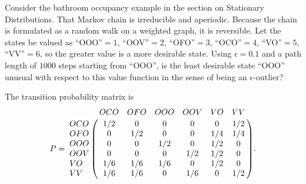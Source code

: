 \documentclass[12pt]{article}
\begin{document}
\begin{exercise}
    Consider the bathroom occupancy example in the section on Stationary
    Distributions.  That Markov chain is irreducible and aperiodic.
    Because the chain is formulated as a random walk on a weighted
    graph, it is reversible.  Let the states be valued as ``OOO''\( =1 \),
    ``OOV''\( =2 \), ``OFO''\( =3 \), ``OCO''\( =4 \), ``VO''\( =5 \),
    ``VV''\( =6 \), so the greater value is a more desirable state.
    Using \( \epsilon=0.1 \) and a path length of \( 1000 \) steps
    starting from ``OOO'', is the least desirable state ``OOO'' unusual
    with respect to this value function in the sense of being an \(
    \epsilon \)-outlier?

    The transition probability matrix is
    \[
        P= \bordermatrix{ & OCO & OFO & OOO & OOV & VO & VV \cr
        OCO & 1/2 & 0 & 0 & 0 & 0 & 1/2 \cr
        OFO & 0 & 1/2 & 0 & 0 & 1/4 & 1/4 \cr
        OOO & 0 & 0 & 1/2 & 0 & 1/2 & 0 \cr
        OOV & 0 & 0 & 0 & 1/2 & 1/2 & 0 \cr
        VO & 1/6 & 1/6 & 1/6 & 0 & 1/2 & 0 \cr
        VV & 1/6 & 1/6 & 0 & 1/6 & 0 & 1/2 \cr
        }.
    \]
\end{exercise}
\end{document}
